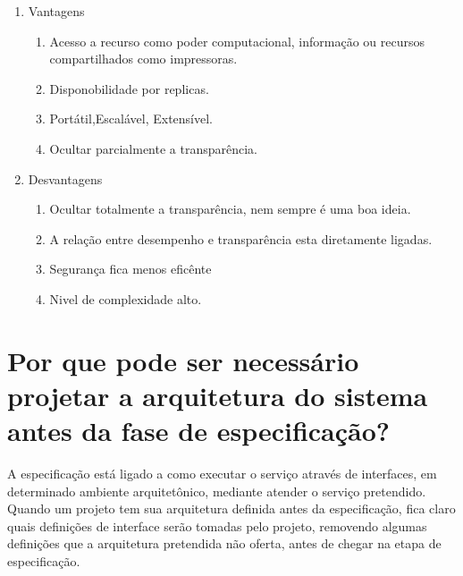 \documentclass[12pt]{article}
\begin{document}
\begin{enumerate}
\begin{enumerate}
			\item Vantagens
				\begin{enumerate}
					\item Acesso a recurso como poder computacional, informação ou recursos compartilhados como impressoras.
					\item Disponobilidade por replicas.
					\item Portátil,Escalável, Extensível.
					\item Ocultar parcialmente a transparência.
				\end{enumerate}
			\item Desvantagens
				\begin{enumerate}
					\item Ocultar totalmente a transparência, nem sempre é uma boa ideia.
					\item A relação entre desempenho e transparência esta diretamente ligadas.
					\item Segurança fica menos eficênte 
					\item Nivel de complexidade alto.
					
				\end{enumerate}
		\end{enumerate}

	\end{enumerate}

%	  

\section{Por que pode ser necessário projetar a arquitetura do sistema antes da fase de
	especificação?}
	A especificação está ligado a como executar o serviço através de interfaces, em determinado ambiente arquitetônico, mediante atender o serviço pretendido. 
Quando um projeto tem sua arquitetura definida antes da especificação, fica claro quais definições de interface serão tomadas pelo projeto, removendo algumas definições que a arquitetura pretendida não oferta, antes de chegar na etapa de especificação.



	
	
	
\end{document}

